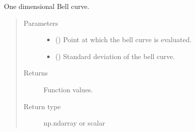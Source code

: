 \documentclass[letterpaper,10pt,english]{sphinxmanual}
\begin{document}
\begin{fulllineitems}
\label{\detokenize{qsim:qsim.noise.bell_curve_1dim}}
One dimensional Bell curve.
\begin{quote}\begin{description}
\item[{Parameters}] \leavevmode\begin{itemize}
\item {} 
 () \textendash{} Point at which the bell curve is evaluated.

\item {} 
 () \textendash{} Standard deviation of the bell curve.

\end{itemize}

\item[{Returns}] \leavevmode
{} \textendash{} Function values.

\item[{Return type}] \leavevmode
np.ndarray or scalar

\end{description}\end{quote}

\end{fulllineitems}

\end{document}
